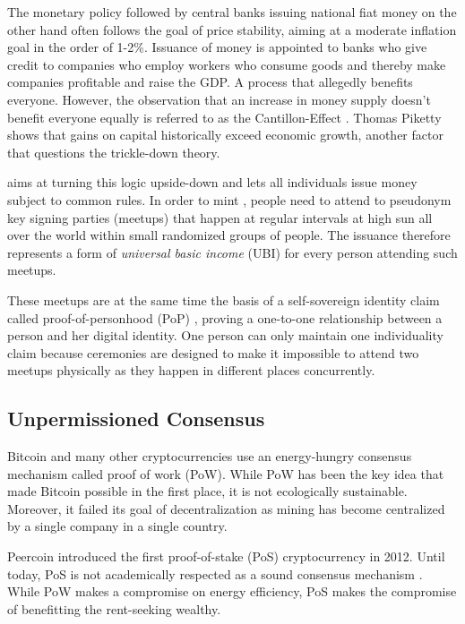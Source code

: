 \documentclass[conference]{IEEEtran}
\begin{document}
The monetary policy followed by central banks issuing national fiat money on the other hand often follows the goal of price stability, aiming at a moderate inflation goal in the order of 1-2\%. Issuance of money is appointed to banks who give credit to companies who employ workers who consume goods and thereby make companies profitable and raise the GDP. A process that allegedly benefits everyone. 
However, the observation that an increase in money supply doesn't benefit everyone equally is referred to as the Cantillon-Effect \cite{cantillon}. Thomas Piketty shows \cite{piketty} that gains on capital historically exceed economic growth, another factor that questions the trickle-down theory. 

\encointer aims at turning this logic upside-down and lets all individuals issue money subject to common rules. In order to mint \encointer, people need to attend to pseudonym key signing parties (meetups) that happen at regular intervals at high sun all over the world within small randomized groups of people. The \encointer issuance therefore represents a form of \textit{universal basic income} (UBI) for every person attending such meetups. 

These \encointer meetups are at the same time the basis of a self-sovereign identity claim called proof-of-personhood (PoP) \cite{ford08} \cite{pop}, proving a one-to-one relationship between a person and her digital identity. One person can only maintain one individuality claim because ceremonies are designed to make it impossible to attend two meetups physically as they happen in different places concurrently. 

\subsection{Unpermissioned Consensus}
Bitcoin and many other cryptocurrencies use an energy-hungry consensus mechanism called proof of work (PoW). While PoW has been the key idea that made Bitcoin possible in the first place, it is not ecologically sustainable. Moreover, it failed its goal of decentralization as mining has become centralized by a single company in a single country. 

Peercoin \cite{sunnyking12} introduced the first proof-of-stake (PoS) cryptocurrency in 2012. Until today, PoS is not academically respected as a sound consensus mechanism \cite{poelstra15}. While PoW makes a compromise on energy efficiency, PoS makes the compromise of benefitting the rent-seeking wealthy.
\end{document}
